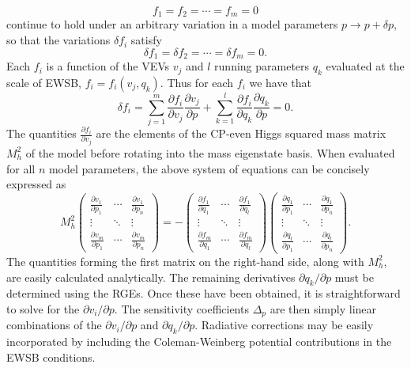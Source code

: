 \documentclass[preprint,amsmath,amssymb,aps,superscriptaddress,prd,showpacs,floatfix]{revtex4-1}
\begin{document}
\begin{equation}\label{eq:EWSBconditions}
f_1=f_2=\dotsb=f_m=0
\end{equation}
continue to hold under an arbitrary variation in a model parameters $p\rightarrow p+\delta p$, so that the variations $\delta f_i$ satisfy
\begin{equation}\label{eq:EWSBvariations}
\delta f_1 = \delta f_2=\dotsb =\delta f_m =0.
\end{equation}
Each $f_i$ is a function of the VEVs $v_j$ and $l$ running parameters $q_k$ evaluated at the scale of EWSB, $f_i=f_i(v_j,q_k)$. Thus for each $f_i$ we have that
\begin{equation}\label{eq:EWSBchainrule}
\delta f_i = \sum_{j=1}^m \frac{\partial f_i}{\partial v_j}\frac{\partial v_j}{\partial p}+\sum_{k=1}^l \frac{\partial f_i}{\partial q_k}\frac{\partial q_k}{\partial p}=0.
\end{equation}
The quantities $\frac{\partial f_i}{\partial v_j}$ are the elements of the CP-even Higgs squared mass matrix $M_h^2$ of the model before rotating into the mass eigenstate basis. When evaluated for all $n$ model parameters, the above system of equations can be concisely expressed as
\begin{equation}\label{eq:tuningsystem}
M_h^2\begin{pmatrix}
\frac{\partial v_1}{\partial p_1} & \cdots & \frac{\partial v_1}{\partial p_n} \\
\vdots & \ddots & \vdots \\
\frac{\partial v_m}{\partial p_1} & \cdots & \frac{\partial v_m}{\partial p_n}
\end{pmatrix}=
-\begin{pmatrix}
\frac{\partial f_1}{\partial q_1} & \cdots & \frac{\partial f_1}{\partial q_l} \\
\vdots & \ddots & \vdots \\
\frac{\partial f_m}{\partial q_1} & \cdots & \frac{\partial f_m}{\partial q_l}
\end{pmatrix}
\begin{pmatrix}
\frac{\partial q_1}{\partial p_1} & \cdots & \frac{\partial q_1}{\partial p_n} \\
\vdots & \ddots & \vdots \\
\frac{\partial q_l}{\partial p_1} & \cdots & \frac{\partial q_l}{\partial p_n}
\end{pmatrix}.
\end{equation} 
The quantities forming the first matrix on the right-hand side, along with $M_h^2$, are easily calculated analytically. The remaining derivatives $\partial q_k /\partial p$ must be determined using the RGEs. Once these have been obtained, it is straightforward to solve for the $\partial v_i /\partial p$. The sensitivity coefficients $\Delta_p$ are then simply linear combinations of the $\partial v_i/\partial p$ and $\partial q_k/\partial p$. Radiative corrections may be easily incorporated by including the Coleman-Weinberg potential contributions in the EWSB conditions.\\ \\
\end{document}
